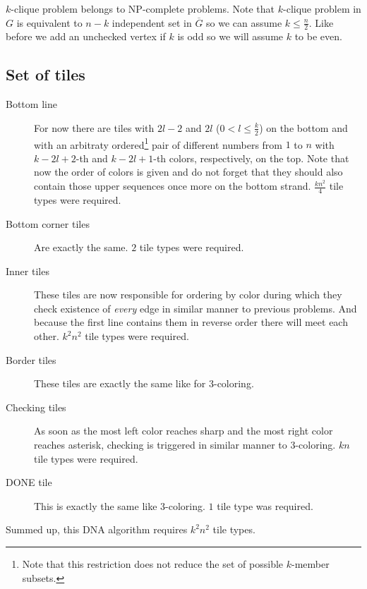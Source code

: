 
$k$-clique problem belongs to NP-complete problems. Note that $k$-clique problem in $G$ is equivalent to $n-k$ independent set in $\overline{G}$ so we can assume $k \leq \frac{n}{2}$. Like before we add an unchecked vertex if $k$ is odd so we will assume $k$ to be even. %

\subsection*{Set of tiles}

\begin{description}
	\item[Bottom line] For now there are tiles with $2l-2$ and $2l$ ($0 < l \leq \frac{k}{2}$) on the bottom and with an arbitraty ordered\footnote{Note that this restriction does not reduce the set of possible $k$-member subsets.} pair of different numbers from $1$ to $n$ with $k-2l+2$-th and $k-2l+1$-th colors, respectively, on the top. Note that now the order of colors is given and do not forget that they should also contain those upper sequences once more on the bottom strand. $\frac{kn^2}{4}$ tile types were required. %
	\item[Bottom corner tiles] Are exactly the same. $2$ tile types were required.
	\item[Inner tiles] These tiles are now responsible for ordering by color during which they check existence of {\em every} edge in similar manner to previous problems. And because the first line contains them in reverse order there will meet each other. $k^2 n^2$ tile types were required. %
	\item[Border tiles] These tiles are exactly the same like for 3-coloring.
	\item[Checking tiles] As soon as the most left color reaches sharp and the most right color reaches asterisk, checking is triggered in similar manner to 3-coloring. $kn$ tile types were required.
	\item[DONE tile] This is exactly the same like 3-coloring. $1$ tile type was required.
\end{description}
Summed up, this DNA algorithm requires $k^2 n^2$ tile types. %

